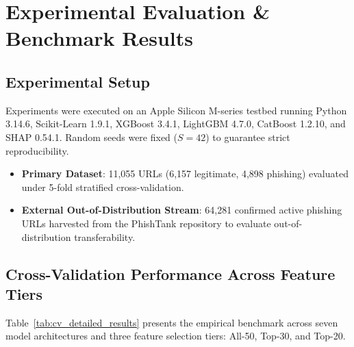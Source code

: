 \documentclass[journal]{IEEEtran}
\begin{document}
\section{Experimental Evaluation \& Benchmark Results}

\subsection{Experimental Setup}
Experiments were executed on an Apple Silicon M-series testbed running Python 3.14.6, Scikit-Learn 1.9.1, XGBoost 3.4.1, LightGBM 4.7.0, CatBoost 1.2.10, and SHAP 0.54.1. Random seeds were fixed ($S = 42$) to guarantee strict reproducibility.
\begin{itemize}
    \item \textbf{Primary Dataset}: 11,055 URLs (6,157 legitimate, 4,898 phishing) evaluated under 5-fold stratified cross-validation.
    \item \textbf{External Out-of-Distribution Stream}: 64,281 confirmed active phishing URLs harvested from the PhishTank repository to evaluate out-of-distribution transferability.
\end{itemize}

\subsection{Cross-Validation Performance Across Feature Tiers}
Table~\ref{tab:cv_detailed_results} presents the empirical benchmark across seven model architectures and three feature selection tiers: All-50, Top-30, and Top-20.
\end{document}
